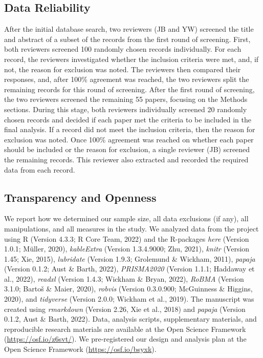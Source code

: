 \documentclass[
  ,pub,floatsintext]{apa6}
\begin{document}
\normalsize

\hypertarget{data-reliability}{%
\subsection{Data Reliability}\label{data-reliability}}

After the initial database search, two reviewers (JB and YW) screened the title and abstract of a subset of the records from the first round of screening. First, both reviewers screened 100 randomly chosen records individually. For each record, the reviewers investigated whether the inclusion criteria were met, and, if not, the reason for exclusion was noted. The reviewers then compared their responses, and, after 100\% agreement was reached, the two reviewers split the remaining records for this round of screening. After the first round of screening, the two reviewers screened the remaining 55 papers, focusing on the Methods sections. During this stage, both reviewers individually screened 20 randomly chosen records and decided if each paper met the criteria to be included in the final analysis. If a record did not meet the inclusion criteria, then the reason for exclusion was noted. Once 100\% agreement was reached on whether each paper should be included or the reason for exclusion, a single reviewer (JB) screened the remaining records. This reviewer also extracted and recorded the required data from each record.

\hypertarget{transparency-and-openness}{%
\subsection{Transparency and Openness}\label{transparency-and-openness}}

We report how we determined our sample size, all data exclusions (if any), all manipulations, and all measures in the study. We analyzed data from the project using R (Version 4.3.3; R Core Team, 2022) and the R-packages \emph{here} (Version 1.0.1; Müller, 2020), \emph{kableExtra} (Version 1.3.4.9000; Zhu, 2021), \emph{knitr} (Version 1.45; Xie, 2015), \emph{lubridate} (Version 1.9.3; Grolemund \& Wickham, 2011), \emph{papaja} (Version 0.1.2; Aust \& Barth, 2022), \emph{PRISMA2020} (Version 1.1.1; Haddaway et al., 2022), \emph{readxl} (Version 1.4.3; Wickham \& Bryan, 2022), \emph{RoBMA} (Version 3.1.0; Bartoš \& Maier, 2020), \emph{robvis} (Version 0.3.0.900; McGuinness \& Higgins, 2020), and \emph{tidyverse} (Version 2.0.0; Wickham et al., 2019). The manuscript was created using \emph{rmarkdown} (Version 2.26, Xie et al., 2018) and \emph{papaja} (Version 0.1.2, Aust \& Barth, 2022). Data, analysis scripts, supplementary materials, and reproducible research materials are available at the Open Science Framework (\url{https://osf.io/z6svt/}). We pre-registered our design and analysis plan at the Open Science Framework (\url{https://osf.io/bsyxk}).
\end{document}
